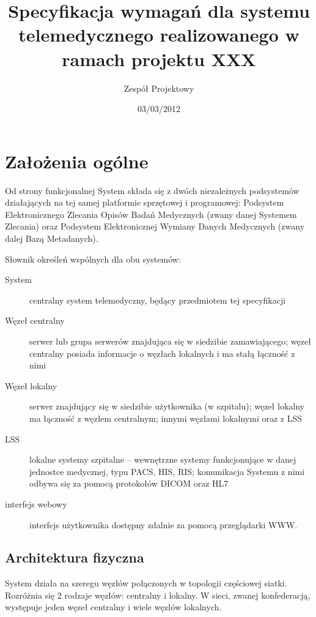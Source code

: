 \documentclass[a4paper]{report}
\begin{document}
\title{Specyfikacja wymagań dla systemu telemedycznego realizowanego w ramach projektu XXX}
\author{Zespół Projektowy}
\date{03/03/2012}
\maketitle

\tableofcontents

\chapter{Założenia ogólne}

Od strony funkcjonalnej System składa się z dwóch niezależnych podsystemów działających na tej samej platformie sprzętowej i programowej: Podsystem Elektronicznego Zlecania Opisów Badań Medycznych (zwany danej Systemem Zlecania) oraz Podsystem Elektronicznej Wymiany Danych Medycznych (zwany dalej Bazą Metadanych).

Słownik określeń wspólnych dla obu systemów:
\begin{description}
\item[System] centralny system telemedyczny, będący przedmiotem tej specyfikacji
\item[Węzeł centralny] serwer lub grupa serwerów znajdująca się w siedzibie zamawiającego; węzeł centralny posiada informacje o węzłach lokalnych i ma stałą łączność z nimi
\item[Węzeł lokalny] serwer znajdujący się w siedzibie użytkownika (w szpitalu); węzeł lokalny ma łączność z węzłem centralnym; innymi węzłami lokalnymi oraz z LSS
\item[LSS] lokalne systemy szpitalne -- wewnętrzne systemy funkcjonujące w danej jednostce medycznej, typu PACS, HIS, RIS; komunikacja Systemu z nimi odbywa się za pomocą protokołów DICOM oraz HL7
\item[interfejs webowy] interfejs użytkownika dostępny zdalnie za pomocą przeglądarki WWW.
\end{description}

\section{Architektura fizyczna}
\label{sec:arch_fiz}

System działa na szeregu węzłów połączonych w topologii częściowej siatki. Rozróżnia się 2 rodzaje węzłów: centralny i lokalny. W sieci, zwanej konfederacją, występuje jeden węzeł centralny i wiele węzłów lokalnych. 
\end{document}
